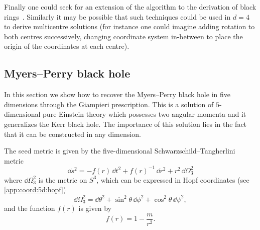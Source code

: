 Finally one could seek for an extension of the algorithm to the derivation of black rings~\cite{Emparan:2002:RotatingBlackRing, Emparan:2008:BlackHolesHigher}.
Similarly it may be possible that such techniques could be used in $d = 4$ to derive multicentre solutions (for instance one could imagine adding rotation to both centres successively, changing coordinate system in-between to place the origin of the coordinates at each centre).


\subsection{Myers--Perry black hole}
\label{sec:higher-jna:5d:myers-perry}


In this section we show how to recover the Myers--Perry black hole in five dimensions through the Giampieri prescription.
This is a solution of $5$-dimensional pure Einstein theory which possesses two angular momenta and it generalizes the Kerr black hole.
The importance of this solution lies in the fact that it can be constructed in any dimension.

The seed metric is given by the five-dimensional Schwarzschild--Tangherlini metric
\begin{equation}
	\dd s^2 = - f(r)\, \dd t^2 + f(r)^{-1}\, \dd r^2 + r^2\, \dd \Omega_3^2
\end{equation}
where $\dd \Omega_3^2$ is the metric on $S^3$, which can be expressed in Hopf coordinates (see \cref{app:coord:5d:hopf})
\begin{equation}
	\label{higher-jna:eq:coord-S3-spherical}
	\dd \Omega_3^2 = \dd\theta^2 + \sin^2 \theta\, \dd\phi^2 + \cos^2 \theta\, \dd\psi^2,
\end{equation} 
and the function $f(r)$ is given by
\begin{equation}
	f(r) = 1 - \frac{m}{r^2}.
\end{equation}

